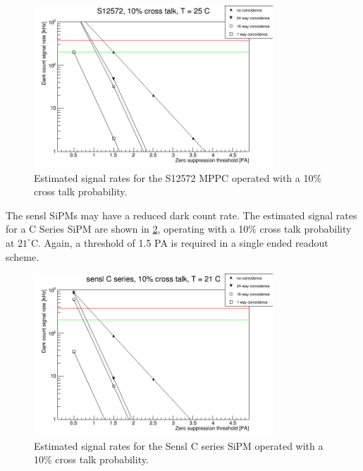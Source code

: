 \documentclass[a4paper]{article}
\begin{document}
\begin{figure}[htp]
    \begin{center}
        \includegraphics[width=0.8\textwidth]{imgs/g_s12572_10pct}
        \caption{Estimated signal rates for the S12572 MPPC operated with a 10\% cross talk probability.}
        \label{rates_s12572_10pct}
    \end{center}
\end{figure}

The sensl SiPMs may have a reduced dark count rate.
The estimated signal rates for a C Series SiPM are shown in \cref{rates_sensl_10pct}, operating with a 10\% cross talk probability at $21^{\circ}$C.
Again, a threshold of 1.5 PA is required in a single ended readout scheme.

\begin{figure}[htp]
    \begin{center}
        \includegraphics[width=0.8\textwidth]{imgs/g_sensl_10pct}
        \caption{Estimated signal rates for the Sensl C series SiPM operated with a 10\% cross talk probability.}
        \label{rates_sensl_10pct}
    \end{center}
\end{figure}
\end{document}
